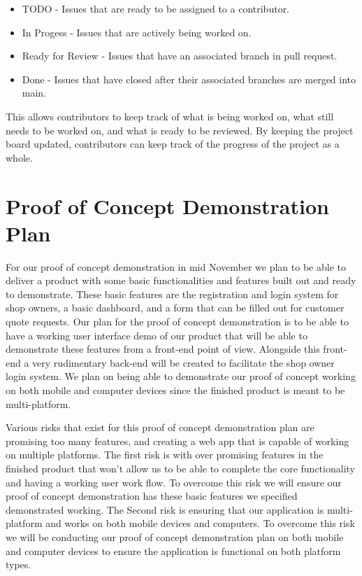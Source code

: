 \documentclass{article}
\begin{document}
\begin{itemize}
    \item TODO - Issues that are ready to be assigned to a contributor.
    \item In Progess - Issues that are actively being worked on.
    \item Ready for Review - Issues that have an associated branch in pull request.
    \item Done - Issues that have closed after their associated branches are merged into main.
\end{itemize}

This allows contributors to keep track of what is being worked on, what still needs to be worked on, and what is ready to be reviewed. By keeping the project board updated, contributors can keep track of the progress of the project as a whole.

\section{Proof of Concept Demonstration Plan}

For our proof of concept demonstration in mid November we plan to be able to deliver a product with some basic functionalities and features built out and ready to demonstrate. These basic features are the registration and login system for shop owners, a basic dashboard, and a form that can be filled out for customer quote requests. Our plan for the proof of concept demonstration is to be able to have a working user interface demo of our product that will be able to demonstrate these features from a front-end point of view. Alongside this front-end a very rudimentary back-end will be created to facilitate the shop owner login system. We plan on being able to demonstrate our proof of concept working on both mobile and computer devices since the finished product is meant to be multi-platform.

Various risks that exist for this proof of concept demonstration plan are promising too many features, and creating a web app that is capable of working on multiple platforms. The first risk is with over promising features in the finished product that won't allow us to be able to complete the core functionality and having a working user work flow. To overcome this risk we will ensure our proof of concept demonstration has these basic features we specified demonstrated working. The Second risk is ensuring that our application is multi-platform and works on both mobile devices and computers. To overcome this risk we will be conducting our proof of concept demonstration plan on both mobile and computer devices to ensure the application is functional on both platform types.
\end{document}
